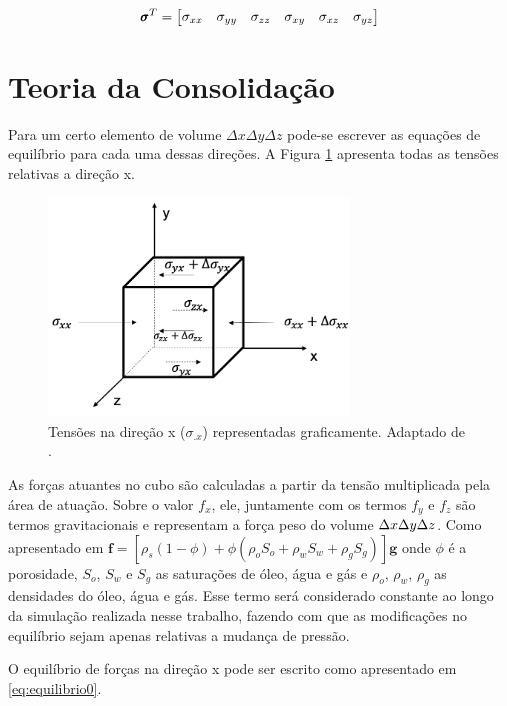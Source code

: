 \begin{equation}
\pmb{\sigma}^T = \begin{bmatrix}
\sigma_{xx} & \sigma_{yy} & \sigma_{zz} & \sigma_{xy} & \sigma_{xz} & \sigma_{yz}
\end{bmatrix}
\label{eq:tensor6}
\end{equation}


\section{Teoria da Consolidação}

Para um certo elemento de volume $\Delta x\Delta y \Delta z$ pode-se escrever as equações de equilíbrio para cada uma dessas direções. A Figura \ref{fig:equilibrio} apresenta todas as tensões relativas a direção x.

\begin{figure}[!htbp]
\centering
\includegraphics[width=8cm]{chap01/figs/equilibrio.png}
\caption{Tensões na direção x ($\sigma_{.x}$) representadas graficamente.  Adaptado de \cite{CompGeomec}.}
\label{fig:equilibrio}
\end{figure}


As forças atuantes no cubo são calculadas a partir da tensão multiplicada pela área de atuação. Sobre o valor $f_x$, ele, juntamente com os termos $f_y$ e $f_z$  são termos gravitacionais e representam a força peso do volume $\Delta x\Delta y\Delta z$. Como apresentado em \citet{xiuligai} $\mathbf{f} = [\rho_s(1-\phi) + \phi(\rho_o S_o + \rho_w S_w + \rho_g S_g )] \mathbf{g}$ onde $\phi$ é a porosidade, $S_o$, $S_w$ e $S_g$ as saturações de óleo, água e gás e $\rho_o$, $\rho_w$, $\rho_g$  as densidades do óleo, água e gás. Esse termo será considerado constante ao longo da simulação realizada nesse trabalho, fazendo com que as modificações no equilíbrio sejam apenas relativas a mudança de pressão. 

O equilíbrio de forças na direção x pode ser escrito como apresentado em \eqref{eq:equilibrio0}. 


